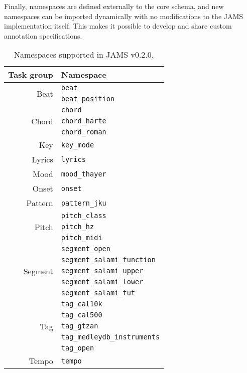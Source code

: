 \documentclass{article}
\begin{document}
Finally, namespaces are defined externally to the core schema, and new namespaces can be imported dynamically with no modifications to the JAMS implementation itself.
This makes it possible to develop and share custom annotation specifications.

\begin{table}
    \caption{Namespaces supported in JAMS v0.2.0.}\label{tab:namespaces}
    \centering
    \begin{tabular}{rl}
    \toprule
    Task group                  & Namespace\\
    \midrule
    \multirow{2}{*}{Beat}       & \texttt{beat}\\
                                & \texttt{beat\_position}\\
    \multirow{3}{*}{Chord}      & \texttt{chord}\\
                                & \texttt{chord\_harte}\\
                                & \texttt{chord\_roman}\\
    Key                         & \texttt{key\_mode }\\
    Lyrics                      & \texttt{lyrics}\\
    Mood                        & \texttt{mood\_thayer}\\
    Onset                       & \texttt{onset}\\
    Pattern                     & \texttt{pattern\_jku}\\
    \multirow{3}{*}{Pitch}      & \texttt{pitch\_class}\\
                                & \texttt{pitch\_hz}\\
                                & \texttt{pitch\_midi}\\
    \multirow{5}{*}{Segment}    & \texttt{segment\_open}\\
                                & \texttt{segment\_salami\_function}\\
                                & \texttt{segment\_salami\_upper}\\
                                & \texttt{segment\_salami\_lower}\\
                                & \texttt{segment\_salami\_tut}\\
    \multirow{5}{*}{Tag}        & \texttt{tag\_cal10k}\\
                                & \texttt{tag\_cal500}\\
                                & \texttt{tag\_gtzan}\\
                                & \texttt{tag\_medleydb\_instruments}\\
                                & \texttt{tag\_open}\\
    Tempo                       & \texttt{tempo}\\
    \bottomrule
    \end{tabular}
\end{table}
\end{document}
